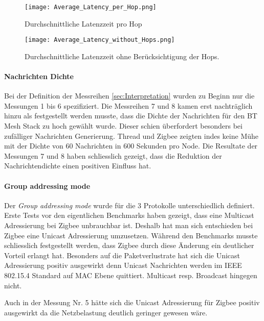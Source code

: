 \begin{figure}[!htbp]
	\centering
	\begin{minipage}[b]{0.49\textwidth}
		\centering
		\texttt{[image: Average\_Latency\_per\_Hop.png]}
		\caption{Durchschnittliche Latenzzeit pro Hop}
		\label{fig:DurchschnittlicheLatenzzeitValidierung}
	\end{minipage}
	\begin{minipage}[b]{0.49\textwidth}
		\centering
		\texttt{[image: Average\_Latency\_without\_Hops.png]}
		\caption{Durchschnittliche Latenzzeit ohne Berücksichtigung der Hops.}	\label{fig:DurchschnittlicheLatenzzeitohneHopsValidierung}
	\end{minipage}
\end{figure}

\newpage
\paragraph{Nachrichten Dichte}
Bei der Definition der Messreihen \ref{sec:Interpretation} wurden zu Beginn nur die Messungen 1 bis 6 spezifiziert.
Die Messreihen 7 und 8 kamen erst nachträglich hinzu als festgestellt werden musste, dass die Dichte der Nachrichten für den BT Mesh Stack zu hoch gewählt wurde.
Dieser schien überfordert besonders bei zufälliger Nachrichten Generierung.
Thread und Zigbee zeigten indes keine Mühe mit der Dichte von 60 Nachrichten in 600 Sekunden pro Node.
Die Resultate der Messungen 7 und 8 haben schliesslich gezeigt, dass die Reduktion der Nachrichtendichte einen positiven Einfluss hat.

\paragraph{Group addressing mode}
Der \textit{Group addressing mode} wurde für die 3 Protokolle unterschiedlich definiert.
Erste Tests vor den eigentlichen Benchmarks haben gezeigt, dass eine Multicast Adressierung bei Zigbee unbrauchbar ist.
Deshalb hat man sich entschieden bei Zigbee eine Unicast Adressierung umzusetzen.
Während den Benchmarks musste schliesslich festgestellt werden, dass Zigbee durch diese Änderung ein deutlicher Vorteil erlangt hat.
Besonders auf die Paketverlustrate hat sich die Unicast Adressierung positiv ausgewirkt denn Unicast Nachrichten werden im IEEE 802.15.4 Standard auf MAC Ebene quittiert.
Multicast resp. Broadcast hingegen nicht.

Auch in der Messung Nr. 5 hätte sich die Unicast Adressierung für Zigbee positiv ausgewirkt da die Netzbelastung deutlich geringer gewesen wäre.

